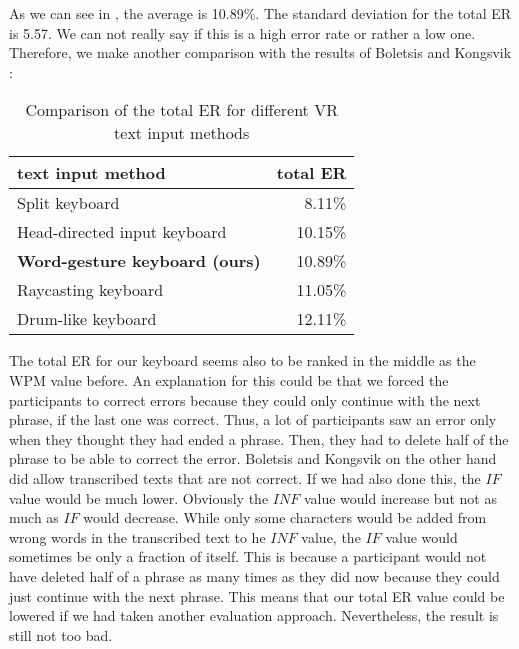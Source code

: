 As we can see in , the average is 10.89\%. The standard deviation for the total ER is 5.57. We can not really say if this is a high error rate or rather a low one. Therefore, we make another comparison with the results of Boletsis and Kongsvik \cite{Boletsis2019ControllerbasedTT}:
\begin{table}[H]
    \centering
    \caption{Comparison of the total ER for different VR text input methods}
    \begin{tabular}{lr} \toprule
        text input method&total ER\\ \midrule
        Split keyboard& 8.11\%\\
        Head-directed input keyboard& 10.15\%\\
        \textbf{Word-gesture keyboard (ours)}& 10.89\%\\
        Raycasting keyboard& 11.05\%\\
        Drum-like keyboard& 12.11\%\\
        \bottomrule
    \end{tabular}
    \label{tab:total_er_compare}
\end{table}
The total ER for our keyboard seems also to be ranked in the middle as the WPM value before. An explanation for this could be that we forced the participants to correct errors because they could only continue with the next phrase, if the last one was correct. Thus, a lot of participants saw an error only when they thought they had ended a phrase. Then, they had to delete half of the phrase to be able to correct the error. Boletsis and Kongsvik \cite{Boletsis2019ControllerbasedTT} on the other hand did allow transcribed texts that are not correct. If we had also done this, the $IF$ value would be much lower. Obviously the $INF$ value would increase but not as much as $IF$ would decrease. While only some characters would be added from wrong words in the transcribed text to he $INF$ value, the $IF$ value would sometimes be only a fraction of itself. This is because a participant would not have deleted half of a phrase as many times as they did now because they could just continue with the next phrase. This means that our total ER value could be lowered if we had taken another evaluation approach. Nevertheless, the result is still not too bad.

